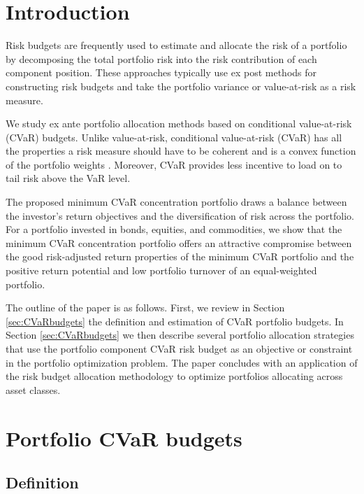 \documentclass[12pt,a4paper]{article}
\renewcommand{\baselinestretch}{1.3}
\begin{document}

\newpage
\renewcommand{\baselinestretch}{1.3}

\section{Introduction}

Risk budgets are frequently used to estimate and allocate the risk of a portfolio by decomposing the total portfolio risk into the risk contribution of each component position. These approaches typically use ex post methods for constructing risk budgets and take the portfolio variance or
 value-at-risk as a risk measure.

 We study ex ante portfolio allocation methods based on conditional value-at-risk (CVaR) budgets. Unlike value-at-risk, conditional value-at-risk (CVaR) has all the properties a risk measure should have to be coherent and is a convex function of the portfolio weights \citep{Artzner1999, Pflug2000}. Moreover, CVaR provides less incentive to load on to tail risk above the VaR level.

The proposed minimum CVaR concentration portfolio draws a balance between the investor's return objectives and the diversification of risk across the portfolio. For a portfolio invested in bonds, equities, and commodities, we show that the minimum CVaR concentration portfolio offers an attractive compromise between the good risk-adjusted return properties of the minimum CVaR portfolio and the positive return potential and low portfolio turnover of an equal-weighted portfolio.

 The outline of the paper is as follows. First, we review in Section \ref{sec:CVaRbudgets} the definition and estimation of CVaR portfolio budgets. In Section \ref{sec:CVaRbudgets} we then describe several portfolio allocation strategies that use the portfolio component CVaR risk budget as an objective or constraint in the portfolio optimization problem. The paper concludes with an application of the risk budget allocation methodology to optimize portfolios allocating across asset classes.

\section{Portfolio CVaR budgets \label{sec:CVaRbudgets}}

\subsection{Definition}
\end{document}
